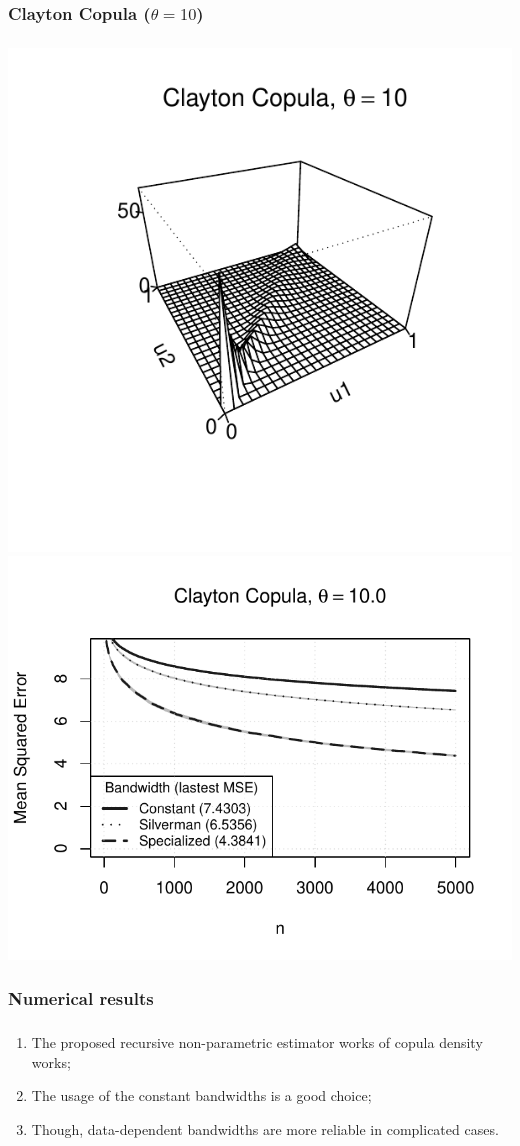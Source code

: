 \documentclass[aspectratio=169]{beamer}
\begin{document}
		\subsubsection{Clayton Copula ($ \theta = 10 $)}
			\begin{frame}
				\frametitle{\insertsubsubsection}
				
				\begin{flushleft}
					\includegraphics[width=0.4\linewidth]{plots/numerical_results/clayton10}
					\includegraphics[width=0.5\linewidth]{../text/plots/experiment_results/clayton10}
				\end{flushleft}
				
			\end{frame}
			
		\subsubsection{Numerical results}
			\begin{frame}
				\frametitle{\insertsubsubsection}
				
				\begin{enumerate}
					\item The proposed recursive non-parametric estimator works of copula density works;
					\item<2-> The usage of the constant bandwidths is a good choice;
					\item<3-> Though, data-dependent bandwidths are more reliable in complicated cases.
				\end{enumerate}
				
			\end{frame}	
	
\end{document}

